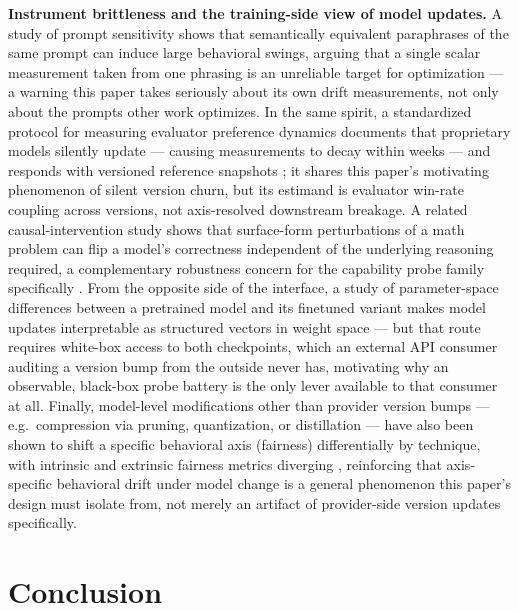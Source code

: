 \documentclass[11pt]{article}
\begin{document}
\textbf{Instrument brittleness and the training-side view of model updates.} A study of prompt sensitivity shows that semantically equivalent paraphrases of the same prompt can induce large behavioral swings, arguing that a single scalar measurement taken from one phrasing is an unreliable target for optimization \citep{TARE2607} --- a warning this paper takes seriously about its own drift measurements, not only about the prompts other work optimizes. In the same spirit, a standardized protocol for measuring evaluator preference dynamics documents that proprietary models silently update --- causing measurements to decay within weeks --- and responds with versioned reference snapshots \citep{EvaluatorPrefDynamics0297}; it shares this paper's motivating phenomenon of silent version churn, but its estimand is evaluator win-rate coupling across versions, not axis-resolved downstream breakage. A related causal-intervention study shows that surface-form perturbations of a math problem can flip a model's correctness independent of the underlying reasoning required, a complementary robustness concern for the capability probe family specifically \citep{CausalRobust6745}. From the opposite side of the interface, a study of parameter-space differences between a pretrained model and its finetuned variant makes model updates interpretable as structured vectors in weight space \citep{WeightDiff2607} --- but that route requires white-box access to both checkpoints, which an external API consumer auditing a version bump from the outside never has, motivating why an observable, black-box probe battery is the only lever available to that consumer at all. Finally, model-level modifications other than provider version bumps --- e.g.\ compression via pruning, quantization, or distillation --- have also been shown to shift a specific behavioral axis (fairness) differentially by technique, with intrinsic and extrinsic fairness metrics diverging \citep{CompressFair0878}, reinforcing that axis-specific behavioral drift under model change is a general phenomenon this paper's design must isolate from, not merely an artifact of provider-side version updates specifically.

\section{Conclusion}
\end{document}
